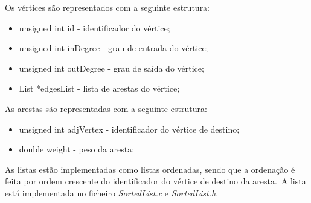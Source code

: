 Os vértices são representados com a seguinte estrutura:

\begin{itemize}
    \item unsigned int id - identificador do vértice;
    \item unsigned int inDegree - grau de entrada do vértice;
    \item unsigned int outDegree - grau de saída do vértice;
    \item List *edgesList - lista de arestas do vértice;
\end{itemize}

\vspace*{5mm}

As arestas são representadas com a seguinte estrutura:

\begin{itemize}
    \item unsigned int adjVertex - identificador do vértice de destino;
    \item double weight - peso da aresta;
\end{itemize}

\vspace*{5mm}

As listas estão implementadas como listas ordenadas, sendo que a ordenação é feita por ordem crescente do identificador do vértice de destino da aresta.\ A lista está implementada no ficheiro \textit{SortedList.c} e \textit{SortedList.h}.